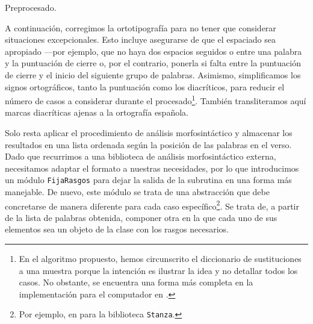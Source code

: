 \begin{algorithm}[!ht] %
	\caption{Preprocesado.}\label{list:preprocess}
\end{algorithm}

A continuación, corregimos la ortotipografía para no tener que considerar situaciones excepcionales. Esto incluye asegurarse de que el espaciado sea  apropiado —por ejemplo, que no haya dos espacios seguidos o entre una palabra y la puntuación de cierre o, por el contrario, ponerla si falta entre la puntuación de cierre y el inicio del siguiente grupo de palabras. Asimismo, 
simplificamos los signos ortográficos, tanto la puntuación como los diacríticos, para reducir el número de casos a considerar durante el procesado\footnote{En el algoritmo propuesto, hemos circunscrito el diccionario de sustituciones a una muestra porque la intención es ilustrar la idea y no detallar todos los casos. No obstante, se encuentra una forma más completa en la implementación para el computador en .}. También transliteramos aquí marcas diacríticas ajenas a la ortografía española.

Solo resta aplicar el procedimiento de análisis morfosintáctico y almacenar los resultados en una lista ordenada según la posición de las palabras en el verso. Dado que recurrimos a una biblioteca de análisis morfosintáctico externa, necesitamos adaptar el formato a nuestras necesidades, por lo que introducimos un módulo \texttt{FijaRasgos} para dejar la salida de la subrutina en una forma más manejable. De nuevo, este módulo se trata de una abstracción que debe concretarse de manera diferente para cada caso específico\footnote{Por ejemplo, en  para la biblioteca \texttt{Stanza}.}. Se trata de, a partir de la lista de palabras obtenida, componer otra en la que cada uno de sus elementos sea un objeto de la clase \Valores con los rasgos necesarios.


